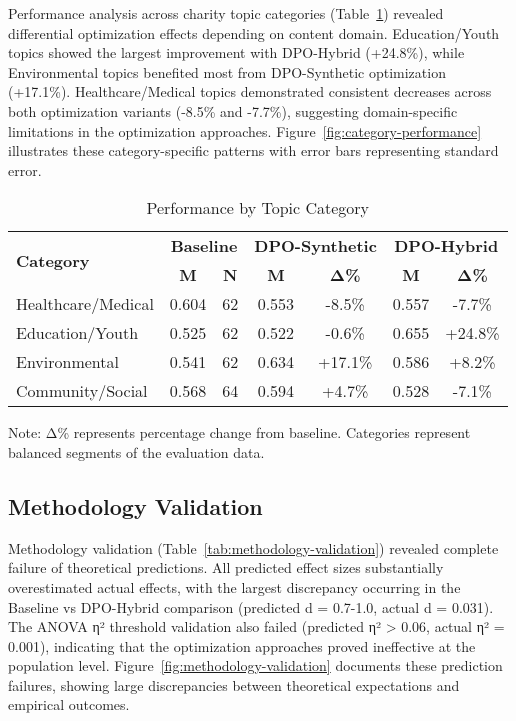 Performance analysis across charity topic categories (Table~\ref{tab:category-analysis}) revealed differential optimization effects depending on content domain. Education/Youth topics showed the largest improvement with DPO-Hybrid (+24.8\%), while Environmental topics benefited most from DPO-Synthetic optimization (+17.1\%). Healthcare/Medical topics demonstrated consistent decreases across both optimization variants (-8.5\% and -7.7\%), suggesting domain-specific limitations in the optimization approaches. Figure~\ref{fig:category-performance} illustrates these category-specific patterns with error bars representing standard error.

\begin{table}[htbp]
\centering
\caption{Performance by Topic Category}
\label{tab:category-analysis}
\begin{tabular}{lcccccc}
\toprule
\multirow{2}{*}{\textbf{Category}} & \multicolumn{2}{c}{\textbf{Baseline}} & \multicolumn{2}{c}{\textbf{DPO-Synthetic}} & \multicolumn{2}{c}{\textbf{DPO-Hybrid}} \\
\cmidrule(lr){2-3} \cmidrule(lr){4-5} \cmidrule(lr){6-7}
& \textbf{M} & \textbf{N} & \textbf{M} & \textbf{Δ\%} & \textbf{M} & \textbf{Δ\%} \\
\midrule
Healthcare/Medical & 0.604 & 62 & 0.553 & -8.5\% & 0.557 & -7.7\% \\
Education/Youth & 0.525 & 62 & 0.522 & -0.6\% & 0.655 & +24.8\% \\
Environmental & 0.541 & 62 & 0.634 & +17.1\% & 0.586 & +8.2\% \\
Community/Social & 0.568 & 64 & 0.594 & +4.7\% & 0.528 & -7.1\% \\

\bottomrule
\end{tabular}
\begin{tablenotes}
\small
\item Note: Δ\% represents percentage change from baseline. Categories represent balanced segments of the evaluation data.
\end{tablenotes}
\end{table}

\subsection{Methodology Validation}

Methodology validation (Table~\ref{tab:methodology-validation}) revealed complete failure of theoretical predictions. All predicted effect sizes substantially overestimated actual effects, with the largest discrepancy occurring in the Baseline vs DPO-Hybrid comparison (predicted d = 0.7-1.0, actual d = 0.031). The ANOVA η² threshold validation also failed (predicted η² > 0.06, actual η² = 0.001), indicating that the optimization approaches proved ineffective at the population level. Figure~\ref{fig:methodology-validation} documents these prediction failures, showing large discrepancies between theoretical expectations and empirical outcomes.

